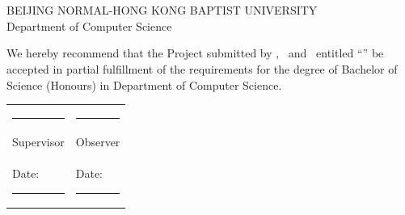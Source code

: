 \chapter*{}
\begin{center}
BEIJING NORMAL-HONG KONG BAPTIST UNIVERSITY\\
Department of Computer Science
\end{center}
\vspace{1cm}
We hereby recommend that the Project submitted by \memberA, \memberB\ and \memberC\ entitled ``\thesistitle'' be accepted in partial fulfillment of the requirements for the degree of Bachelor of Science (Honours) in Department of Computer Science.

\vspace{3cm}
\begin{tabular}{p{7cm}p{7cm}}
\rule{6cm}{0.4pt} & \rule{6cm}{0.4pt}\\
Supervisor & Observer\\[1em]
Date: \rule{4cm}{0.4pt} & Date: \rule{4cm}{0.4pt}
\end{tabular}

